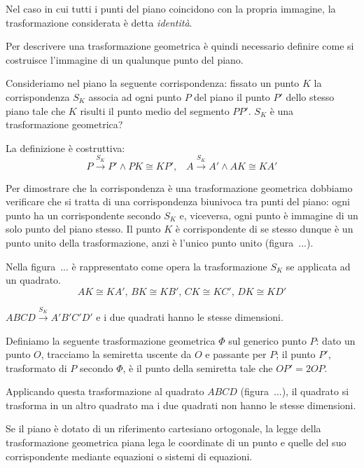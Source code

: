 Nel caso in cui tutti i punti del piano coincidono con la propria immagine, la trasformazione considerata è detta \emph{identità}.

Per descrivere una trasformazione geometrica è quindi necessario definire come si costruisce l'immagine di un qualunque punto del piano.

\begin{exrig}
\begin{esempio}
Consideriamo nel piano la seguente corrispondenza: fissato un punto $K$ la corrispondenza $S_K$ associa ad ogni punto $P$ del piano il punto $P'$ dello stesso piano tale che $K$ risulti il punto medio del segmento $PP'$. $S_K$ è una trasformazione geometrica?\vspace{7pt}

La definizione è costruttiva:
\[P\overset{S_K}{\rightarrow}P' \wedge PK\cong KP'\text{,} \quad  A\overset{S_K}{\rightarrow}A' \wedge AK\cong KA'\]

Per dimostrare che la corrispondenza è una trasformazione geometrica dobbiamo verificare che si tratta di una corrispondenza biunivoca tra punti del piano: ogni punto ha un corrispondente secondo $S_K$ e, viceversa, ogni punto è immagine di un solo punto del piano stesso. Il punto $K$ è corrispondente di se stesso dunque è un punto unito della trasformazione, anzi è l'unico punto unito (figura~...).

Nella figura~... è rappresentato come opera la trasformazione $S_K$ se applicata ad un quadrato.
\[AK\cong KA'\text{, }BK\cong KB'\text{, }CK\cong KC'\text{, }DK\cong KD'\]

$ABCD\overset{S_K}{\rightarrow}A'B'C'D'$ e i due quadrati hanno le stesse dimensioni.
\end{esempio}

\begin{esempio}
Definiamo la seguente trasformazione geometrica $\Phi$ sul generico punto $P$: dato un punto $O$, tracciamo la semiretta uscente da $O$ e passante per $P$; il punto $P'$, trasformato di $P$ secondo $\Phi$, è il punto della semiretta tale che $OP'=2OP$.\vspace{7pt}

Applicando questa trasformazione al quadrato $ABCD$ (figura~...), il quadrato si trasforma in un altro quadrato ma i due quadrati non hanno le stesse dimensioni.
\end{esempio}
\end{exrig}

Se il piano è dotato di un riferimento cartesiano ortogonale, la legge della trasformazione geometrica piana lega le coordinate di un punto e quelle del suo corrispondente mediante equazioni o sistemi di equazioni.
 
